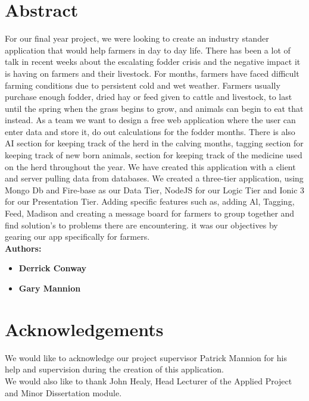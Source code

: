 \documentclass[12pt,a4paper,oneside,openany]{book}
\begin{document}
\newpage
\listoffigures
\renewcommand{\thefigure}{\arabic{chapter}.\arabic{figure}}


\newpage

\chapter*{Abstract}
For our final year project, we were looking to create an industry stander application that would help farmers in day to day life. There has been a lot of talk in recent weeks about the escalating fodder crisis and the negative impact it is having on farmers and their livestock. For months, farmers have faced difficult farming conditions due to persistent cold and wet weather. Farmers usually purchase enough fodder, dried hay or feed given to cattle and livestock, to last until the spring when the grass begins to grow, and animals can begin to eat that instead. As a team we want to design a free web application where the user can enter data and store it, do out calculations for the fodder months. There is also AI section for keeping track of the herd in the calving months, tagging section for keeping track of new born animals, section for keeping track of the medicine used on the herd throughout the year. We have created this application with a client and server pulling data from databases. We created a three-tier application, using Mongo Db and Fire-base as our Data Tier, NodeJS for our Logic Tier and Ionic 3 for our Presentation Tier.
Adding specific features such as, adding Al, Tagging, Feed, Madison and creating a message board for farmers to group together and find solution's to problems there are encountering. it was our objectives by gearing our app specifically for farmers. \\

\noindent \textbf{Authors:}

\begin{itemize}
    \item \textbf {Derrick Conway}
    \item \textbf {Gary Mannion}
\end{itemize}


\chapter*{\centering Acknowledgements}
{\large
\noindent We would like to acknowledge our project supervisor Patrick Mannion for his help and supervision during the creation of this application.\\

\noindent We would also like to thank John Healy, Head Lecturer of the Applied Project and Minor Dissertation module. 
}
\end{document}

